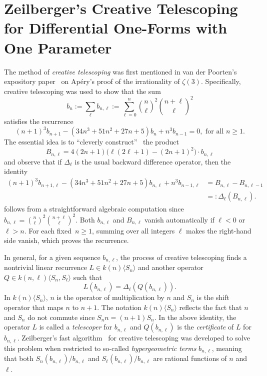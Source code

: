 \documentclass{amsart}
\theoremstyle{definition}
\numberwithin{equation}{section}
\numberwithin{thm}{section}
\begin{document}
\section{Zeilberger's Creative Telescoping for Differential One-Forms with One Parameter}
\label{SECT:ZeilCT}
The method of \textit{creative telescoping} was first mentioned in van der Poorten's expository paper~\cite{Poorten1978} on Ap\'{e}ry's proof of the irrationality of $\zeta(3)$. Specifically, creative telescoping was used to show that the sum
\[ b_n := \sum_\ell b_{n,\ell} := \sum_{\ell=0}^n \binom{n}{\ell}^2\binom{n+\ell}{\ell}^2\]
satisfies the recurrence
\[(n+1)^3 b_{n+1} -(34n^3+51n^2+27n+5)b_{n} +n^3b_{n-1} =0, \text{ for all } n \geq 1.\]
The essential idea is to ``cleverly construct''~\cite{Poorten1978} the product
\[B_{n,\ell} =  4(2n+1)\big(\ell(2\ell+1)-(2n+1)^2\big) \cdot b_{n,\ell} \]
and observe that if $\Delta_\ell$ is the usual backward difference operator, then the identity
\begin{align*} 
(n+1)^3 b_{n+1,\ell} -(34n^3+51n^2+27n+5)b_{n,\ell} +n^3b_{n-1,\ell} &=B_{n,\ell}- B_{n,\ell-1}\\ &=: \Delta_\ell(B_{n,\ell}). 
\end{align*}
follows from a straightforward algebraic computation since $b_{n,\ell} =  \binom{n}{\ell}^2\binom{n+\ell}{\ell}^2$. Both $b_{n,\ell}$ and $B_{n,\ell}$ vanish automatically if $\ell < 0$ or $\ell > n$. For each fixed~$n \ge 1$, summing over all integers $\ell$ makes the right-hand side vanish, which proves the recurrence.

In general, for a given sequence $b_{n, \ell}$, the process of creative telescoping finds
a nontrivial linear recurrence $L\in k(n)\langle S_n\rangle$ and another operator $Q\in k(n, \ell)\langle S_n, S_{\ell}\rangle$ such that
\[
L(b_{n, \ell}) = \Delta_\ell(Q(b_{n, \ell})).
\]
In $k(n)\langle S_n\rangle$, $n$ is the operator of multiplication by $n$ and $S_n$ is the shift operator that maps $n$ to $n+1$.  The notation $k(n)\langle S_n\rangle$ reflects the fact that $n$ and $S_n$ do not commute since $S_n n = (n+1)S_n$. In the above identity, the operator $L$ is called a \textit{telescoper} for $b_{n, \ell}$ and $Q(b_{n, \ell})$ is the \textit{certificate} of $L$ for $b_{n, \ell}$. Zeilberger's fast algorithm~\cite{Zeilberger1990,Zeilberger1991} for creative telescoping was developed to solve this problem when restricted to so-called \textit{hypergeometric terms}  $b_{n ,\ell}$, meaning that both $S_n(b_{n,\ell})/b_{n,\ell}$ and $S_\ell(b_{n,\ell})/b_{n,\ell}$ are rational functions of $n$ and $\ell$.
\end{document}
